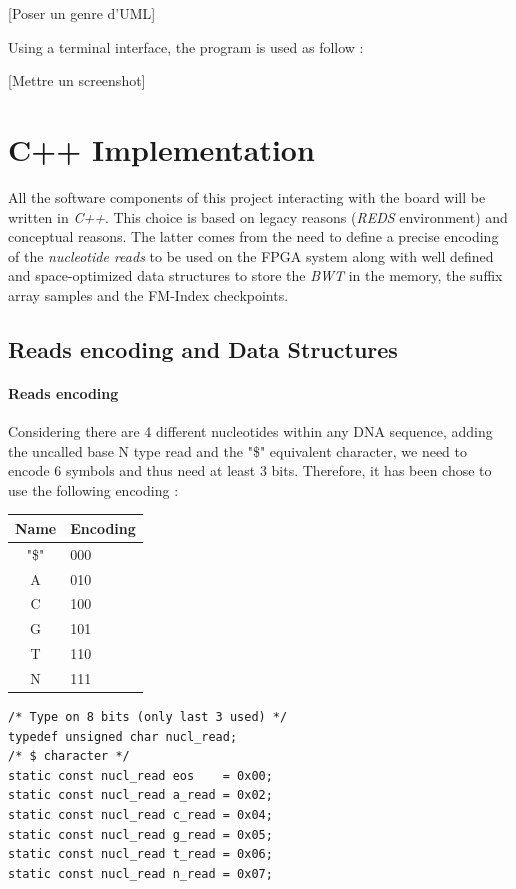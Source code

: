 [Poser un genre d'UML]

Using a terminal interface, the program is used as follow : 

[Mettre un screenshot]

\section{C++ Implementation}

All the software components of this project interacting with the board will be written in \textsl{C++}. This choice is based on legacy reasons (\textsl{REDS} environment) and conceptual reasons. The latter comes from the need to define a precise encoding of the \textsl{nucleotide reads} to be used on the FPGA system along with well defined and space-optimized data structures to store the \textsl{BWT} in the memory, the suffix array samples and the FM-Index checkpoints.

\subsection{Reads encoding and Data Structures}

\paragraph{Reads encoding}

Considering there are 4 different nucleotides within any DNA sequence, adding the uncalled base N type read and the "\$" equivalent character, we need to encode 6 symbols and thus need at least 3 bits. Therefore, it has been chose to use the following encoding : \\

\begin{minipage}[c]{0.35\textwidth}
\vspace*{6mm}
	\begin{tabular}{|c|l|}
	\hline
		Name & Encoding \\
		\hline 
		"\$" & 000 \\
		A & 010 \\
		C & 100 \\
		G & 101 \\
		T & 110 \\
		N & 111 \\
    \hline
	\end{tabular}
\end{minipage}
\begin{minipage}[t]{0.85\textwidth}
\vspace*{-30mm}
    \begin{verbatim}
/* Type on 8 bits (only last 3 used) */
typedef unsigned char nucl_read; 
/* $ character */
static const nucl_read eos    = 0x00;	
static const nucl_read a_read = 0x02;
static const nucl_read c_read = 0x04;
static const nucl_read g_read = 0x05;
static const nucl_read t_read = 0x06;
static const nucl_read n_read = 0x07;
    \end{verbatim}
\begin{lstlisting}


\end{lstlisting}
\end{minipage}
\vspace*{3mm}

